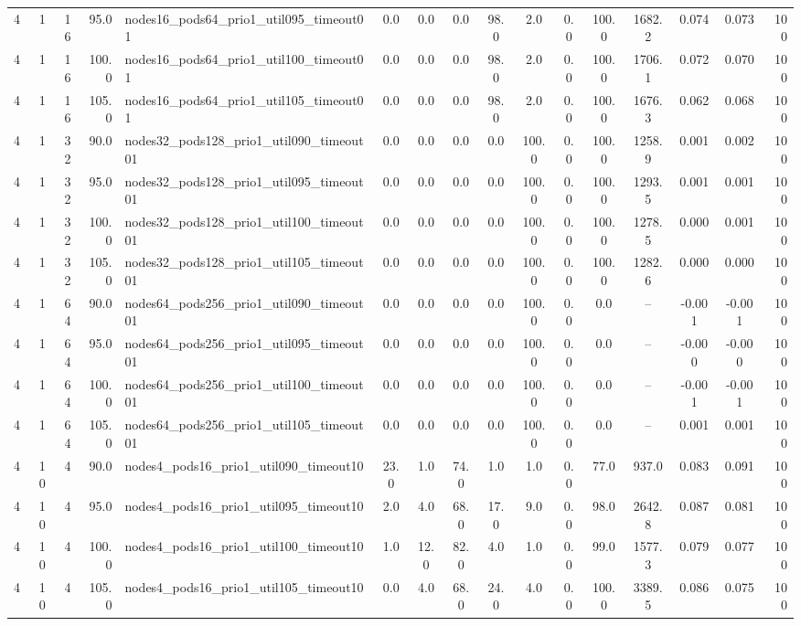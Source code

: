 \begin{tabular}{r r r r l c c c c c c c c c c r}
4 & 1 & 16 & 95.0 & nodes16\_pods64\_prio1\_util095\_timeout01 & 0.0 & 0.0 & 0.0 & 98.0 & 2.0 & 0.0 & 100.0 & 1682.2 & 0.074 & 0.073 & 100 \\
4 & 1 & 16 & 100.0 & nodes16\_pods64\_prio1\_util100\_timeout01 & 0.0 & 0.0 & 0.0 & 98.0 & 2.0 & 0.0 & 100.0 & 1706.1 & 0.072 & 0.070 & 100 \\
4 & 1 & 16 & 105.0 & nodes16\_pods64\_prio1\_util105\_timeout01 & 0.0 & 0.0 & 0.0 & 98.0 & 2.0 & 0.0 & 100.0 & 1676.3 & 0.062 & 0.068 & 100 \\
4 & 1 & 32 & 90.0 & nodes32\_pods128\_prio1\_util090\_timeout01 & 0.0 & 0.0 & 0.0 & 0.0 & 100.0 & 0.0 & 100.0 & 1258.9 & 0.001 & 0.002 & 100 \\
4 & 1 & 32 & 95.0 & nodes32\_pods128\_prio1\_util095\_timeout01 & 0.0 & 0.0 & 0.0 & 0.0 & 100.0 & 0.0 & 100.0 & 1293.5 & 0.001 & 0.001 & 100 \\
4 & 1 & 32 & 100.0 & nodes32\_pods128\_prio1\_util100\_timeout01 & 0.0 & 0.0 & 0.0 & 0.0 & 100.0 & 0.0 & 100.0 & 1278.5 & 0.000 & 0.001 & 100 \\
4 & 1 & 32 & 105.0 & nodes32\_pods128\_prio1\_util105\_timeout01 & 0.0 & 0.0 & 0.0 & 0.0 & 100.0 & 0.0 & 100.0 & 1282.6 & 0.000 & 0.000 & 100 \\
4 & 1 & 64 & 90.0 & nodes64\_pods256\_prio1\_util090\_timeout01 & 0.0 & 0.0 & 0.0 & 0.0 & 100.0 & 0.0 & 0.0 & -- & -0.001 & -0.001 & 100 \\
4 & 1 & 64 & 95.0 & nodes64\_pods256\_prio1\_util095\_timeout01 & 0.0 & 0.0 & 0.0 & 0.0 & 100.0 & 0.0 & 0.0 & -- & -0.000 & -0.000 & 100 \\
4 & 1 & 64 & 100.0 & nodes64\_pods256\_prio1\_util100\_timeout01 & 0.0 & 0.0 & 0.0 & 0.0 & 100.0 & 0.0 & 0.0 & -- & -0.001 & -0.001 & 100 \\
4 & 1 & 64 & 105.0 & nodes64\_pods256\_prio1\_util105\_timeout01 & 0.0 & 0.0 & 0.0 & 0.0 & 100.0 & 0.0 & 0.0 & -- & 0.001 & 0.001 & 100 \\
4 & 10 & 4 & 90.0 & nodes4\_pods16\_prio1\_util090\_timeout10 & 23.0 & 1.0 & 74.0 & 1.0 & 1.0 & 0.0 & 77.0 & 937.0 & 0.083 & 0.091 & 100 \\
4 & 10 & 4 & 95.0 & nodes4\_pods16\_prio1\_util095\_timeout10 & 2.0 & 4.0 & 68.0 & 17.0 & 9.0 & 0.0 & 98.0 & 2642.8 & 0.087 & 0.081 & 100 \\
4 & 10 & 4 & 100.0 & nodes4\_pods16\_prio1\_util100\_timeout10 & 1.0 & 12.0 & 82.0 & 4.0 & 1.0 & 0.0 & 99.0 & 1577.3 & 0.079 & 0.077 & 100 \\
4 & 10 & 4 & 105.0 & nodes4\_pods16\_prio1\_util105\_timeout10 & 0.0 & 4.0 & 68.0 & 24.0 & 4.0 & 0.0 & 100.0 & 3389.5 & 0.086 & 0.075 & 100 \\

\end{tabular}
